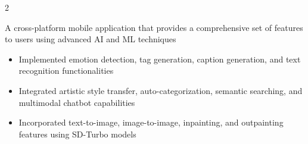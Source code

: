 \documentclass[10pt,a4paper,ragged2e,withhyper]{altacv}
\begin{document}
\begin{paracol}{2}








A cross-platform mobile application that provides a comprehensive set of features to users using advanced AI and ML techniques

\medskip

\begin{itemize}
\item Implemented emotion detection, tag generation, caption generation, and text recognition functionalities
\item Integrated artistic style transfer, auto-categorization, semantic searching, and multimodal chatbot capabilities
\item Incorporated text-to-image, image-to-image, inpainting, and outpainting features using SD-Turbo models
\end{itemize}


\end{paracol}
\end{document}
